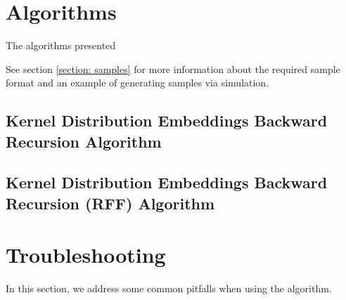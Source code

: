 \documentclass[11pt]{article}
\begin{document}

\section{Algorithms}
\label{section: algorithms}

The algorithms presented

See section \ref{section: samples} for more information about the required sample format and an example of generating samples via simulation. 


\subsection{Kernel Distribution Embeddings Backward Recursion Algorithm}



\subsection{Kernel Distribution Embeddings Backward Recursion (RFF) Algorithm}



\section{Troubleshooting}

In this section, we address some common pitfalls when using the algorithm.
\end{document}
